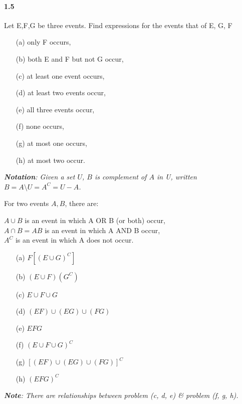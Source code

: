 \paragraph{1.5}
Let E,F,G be three events. Find expressions for the events that of E, G, F
\begin{itemize}
    \item[(a)] only F occurs,
    \item[(b)] both E and F but not G occur,
    \item[(c)] at least one event occurs,
    \item[(d)] at least two events occur,
    \item[(e)] all three events occur,
    \item[(f)] none occurs,
    \item[(g)] at most one occurs,
    \item[(h)] at most two occur.
\end{itemize}

\noindent \textit{\textbf{Notation}: Given a set $U$, $B$ is complement of $A$ in U, written $B = A \setminus U = A^C = U - A$.}

\begin{solution}

For two events $A, B$, there are:

\begin{center}
    $A\cup B$ is an event in which A OR B (or both) occur,\\
    $A\cap B = AB$ is an event in which A AND B occur,\\
    $A^C$ is an event in which A does not occur.
\end{center}

\begin{itemize}
    \item[(a)] $F[(E\cup G)^C]$
    \item[(b)] $(E\cup F)(G^C)$
    \item[(c)] $E\cup F\cup G$
    \item[(d)] $(EF)\cup (EG)\cup (FG)$
    \item[(e)] $EFG$
    \item[(f)] $(E\cup F\cup G)^C$
    \item[(g)] $[(EF)\cup (EG)\cup (FG)]^C$
    \item[(h)] $(EFG)^C$
\end{itemize}

\textit{\textbf{Note}: There are relationships between problem (c, d, e) \& problem (f, g, h).}

\end{solution}

